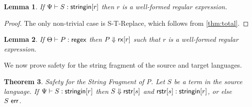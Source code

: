 \documentclass{acm_proc_article-sp}
\newtheorem{thm}{Theorem}
\newtheorem{lem}[thm]{Lemma}
\theoremstyle{definition}
\newcommand{\stringin}[1]{{\sf stringin}[#1]}
\newcommand{\rx}[1]{ {\sf rx}[#1] }
\newcommand{\regex}{{\sf regex}}
\newcommand{\err}{\ {\sf err}}
\newcommand{\treduces}{ \Downarrow }
\newcommand{\sreduces}{ \Downarrow }
\begin{document}
\begin{lem}
  If $\sctx \vdash S : \stringin{r}$ then $r$ is a well-formed regular expression. 
\end{lem}
\begin{proof}
  The only non-trivial case is S-T-Replace, which follows from \ref{thm:total}. 
\end{proof}

\begin{lem}
  If $\tctx \vdash P : \regex$ then $P \treduces \rx{r}$ such that $r$ is a well-formed regular expression. 
\end{lem}

We now prove safety for the string fragment of the source and target languages.

\begin{thm}{Safety for the String Fragment of P.}
  Let $S$ be a term in the source language. If $\sctx \vdash S : \stringin{r}$ 
  then $S \sreduces \rstr{s}$ and $\rstr{s} : \stringin{r}$, or else $S \err$.
\end{thm}
\end{document}
